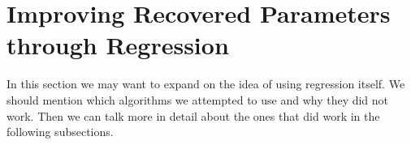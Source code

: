 \section{Improving Recovered Parameters through Regression}
\label{sec:ML_concept}
In this section we may want to expand on the idea of using regression itself.
We should mention which algorithms we attempted to use and why they did not
work. Then we can talk more in detail about the ones that did work in the
following subsections.